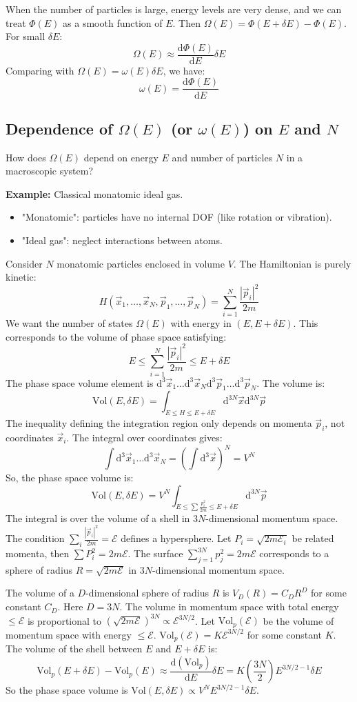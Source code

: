 \documentclass[11pt]{article}
\newcommand{\dd}[1]{\mathrm{d}#1} %
\newcommand{\deriv}[2]{\frac{\mathrm{d} #1}{\mathrm{d} #2}}
\newcommand{\OmegaE}{\Omega(E)}
\newcommand{\omegaE}{\omega(E)}
\newcommand{\PhiE}{\Phi(E)}
\newcommand{\deltaE}{\delta E}
\begin{document}
When the number of particles is large, energy levels are very dense, and we can treat $\PhiE$ as a smooth function of $E$.
Then $\Omega(E) = \Phi(E+\deltaE) - \Phi(E)$.
For small $\deltaE$:
\[ \Omega(E) \approx \deriv{\PhiE}{E} \deltaE \]
Comparing with $\OmegaE = \omegaE \deltaE$, we have:
\[ \omegaE = \deriv{\PhiE}{E} \]

\subsection*{Dependence of $\OmegaE$ (or $\omegaE$) on $E$ and $N$}

How does $\OmegaE$ depend on energy $E$ and number of particles $N$ in a macroscopic system?

\textbf{Example:} Classical monatomic ideal gas.
\begin{itemize}
    \item "Monatomic": particles have no internal DOF (like rotation or vibration).
    \item "Ideal gas": neglect interactions between atoms.
\end{itemize}
Consider $N$ monatomic particles enclosed in volume $V$. The Hamiltonian is purely kinetic:
\[ H(\vec{x}_1, \dots, \vec{x}_N, \vec{p}_1, \dots, \vec{p}_N) = \sum_{i=1}^N \frac{|\vec{p}_i|^2}{2m} \]
We want the number of states $\OmegaE$ with energy in $(E, E+\deltaE)$. This corresponds to the volume of phase space satisfying:
\[ E \le \sum_{i=1}^N \frac{|\vec{p}_i|^2}{2m} \le E+\deltaE \]
The phase space volume element is $\dd{^3\vec{x}_1} \dots \dd{^3\vec{x}_N} \dd{^3\vec{p}_1} \dots \dd{^3\vec{p}_N}$.
The volume is:
\[ \text{Vol}(E, \deltaE) = \int_{E \le H \le E+\deltaE} \dd{^{3N}\vec{x}} \dd{^{3N}\vec{p}} \]
The inequality defining the integration region only depends on momenta $\vec{p}_i$, not coordinates $\vec{x}_i$. The integral over coordinates gives:
\[ \int \dd{^3\vec{x}_1} \dots \dd{^3\vec{x}_N} = \left( \int \dd{^3\vec{x}} \right)^N = V^N \]
So, the phase space volume is:
\[ \text{Vol}(E, \deltaE) = V^N \int_{E \le \sum \frac{p_i^2}{2m} \le E+\deltaE} \dd{^{3N}\vec{p}} \]
The integral is over the volume of a shell in $3N$-dimensional momentum space. The condition $\sum_i \frac{|\vec{p}_i|^2}{2m} = \mathcal{E}$ defines a hypersphere. Let $P_i = \sqrt{2m\mathcal{E}_i}$ be related momenta, then $\sum P_i^2 = 2m\mathcal{E}$. The surface $\sum_{j=1}^{3N} p_j^2 = 2m\mathcal{E}$ corresponds to a sphere of radius $R = \sqrt{2m\mathcal{E}}$ in $3N$-dimensional momentum space.

The volume of a $D$-dimensional sphere of radius $R$ is $V_D(R) = C_D R^D$ for some constant $C_D$.
Here $D=3N$. The volume in momentum space with total energy $\le \mathcal{E}$ is proportional to $(\sqrt{2m\mathcal{E}})^{3N} \propto \mathcal{E}^{3N/2}$.
Let $\text{Vol}_p(\mathcal{E})$ be the volume of momentum space with energy $\le \mathcal{E}$.
$\text{Vol}_p(\mathcal{E}) = K \mathcal{E}^{3N/2}$ for some constant $K$.
The volume of the shell between $E$ and $E+\deltaE$ is:
\[ \text{Vol}_p(E+\deltaE) - \text{Vol}_p(E) \approx \deriv{(\text{Vol}_p)}{E} \deltaE = K \left(\frac{3N}{2}\right) E^{3N/2 - 1} \deltaE \]
So the phase space volume is $\text{Vol}(E, \deltaE) \propto V^N E^{3N/2 - 1} \deltaE$.
\end{document}
